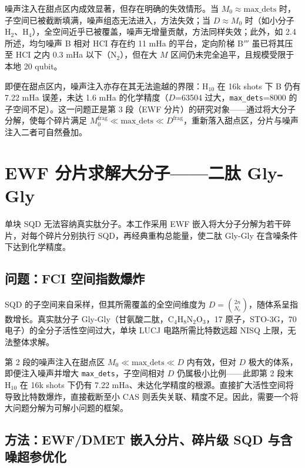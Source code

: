 \documentclass[UTF8,12pt,a4paper]{ctexart}
\newcommand{\Htwo}{H$_2$}
\newcommand{\Ntwo}{N$_2$}
\begin{document}
噪声注入在甜点区内成效显著，但存在明确的失效情形。当 $M_0\approx\text{max\_dets}$ 时，子空间已被截断填满，噪声组态无法进入，方法失效；当 $D\approx M_0$ 时（如小分子 \Htwo{}、H$_4$），全空间近乎已被覆盖，噪声无增量贡献，方法同样失效；此外，如 2.4 所述，均匀噪声 B 相对 HCI 存在约 11 mHa 的平台，定向阶梯 B$'''$ 虽已将其压至 HCI 之内 0.3 mHa 以下（\Ntwo{}），但在大 $M$ 区间仍未完全追平，且规模受限于本地 20 qubit。

即便在甜点区内，噪声注入亦存在其无法逾越的界限：H$_{10}$ 在 16k shots 下 B 仍有 7.22 mHa 误差，未达 1.6 mHa 的化学精度（$D$=63504 过大，\texttt{max\_dets}=8000 的子空间不足）。这一问题正是第 3 段（EWF 分片）的研究对象——通过将大分子分解，使每个碎片满足 $M_0^{\text{frag}}\ll\text{max\_dets}\ll D^{\text{frag}}$，重新落入甜点区，分片与噪声注入二者可自然叠加。

\section{EWF 分片求解大分子——二肽 Gly-Gly}

单块 SQD 无法容纳真实肽分子。本工作采用 EWF 嵌入将大分子分解为若干碎片，对每个碎片分别执行 SQD，再经典重构总能量，使二肽 Gly-Gly 在含噪条件下达到化学精度。

\subsection{问题：FCI 空间指数爆炸}

SQD 的子空间来自采样，但其所需覆盖的全空间维度为 $D=\binom{2n}{N_e}$，随体系呈指数增长。真实肽分子 Gly-Gly（甘氨酸二肽，C$_4$H$_8$N$_2$O$_3$，17 原子，STO-3G，70 电子）的全分子活性空间过大，单块 LUCJ 电路所需比特数远超 NISQ 上限，无法整体求解。

第 2 段的噪声注入在甜点区 $M_0\ll\text{max\_dets}\ll D$ 内有效，但对 $D$ 极大的体系，即便注入噪声并增大 \texttt{max\_dets}，子空间相对 $D$ 仍属极小比例——此即第 2 段末 H$_{10}$ 在 16k shots 下仍有 7.22 mHa、未达化学精度的根源。直接扩大活性空间将导致比特数爆炸，直接截断至小 CAS 则丢失关联、精度不足。因此，需要一个将大问题分解为可解小问题的框架。

\subsection{方法：EWF/DMET 嵌入分片、碎片级 SQD 与含噪超参优化}
\end{document}
